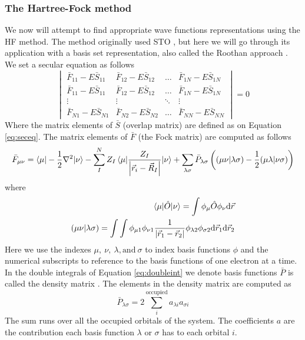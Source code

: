 \documentclass[../master_thesis.tex]{subfiles}
\begin{document}
\subsubsection{The Hartree-Fock method}
We now will attempt to find appropriate wave functions representations using the \ac{HF} method.
The method originally used \ac{STO} \cite{Cramer:2004}, but here we will
go through its application with a basis set representation, also called the Roothan approach
\cite{Cramer:2004, Helgaker:2012}.
We set a secular equation as follows
\begin{equation}\label{eq:fockseceq}
  \begin{vmatrix}
    \bar{F}_{11} - E\bar{S}_{11} & \bar{F}_{12} - E\bar{S}_{12} & \ldots & \bar{F}_{1N} - E\bar{S}_{1N} \\
    \bar{F}_{11} - E\bar{S}_{11} & \bar{F}_{12} - E\bar{S}_{12} & \ldots & \bar{F}_{1N} - E\bar{S}_{1N} \\
    \vdots & \vdots & \ddots & \vdots\\
    \bar{F}_{N1} - E\bar{S}_{N1} & \bar{F}_{N2} - E\bar{S}_{N2} & \ldots & \bar{F}_{NN} - E\bar{S}_{NN}
  \end{vmatrix} = 0
\end{equation}
Where the matrix elements of $\bar{S}$ (overlap matrix) are defined as on Equation
\ref{eq:seceq}. The matrix elements of $\bar{F}$ (the Fock matrix) are computed
as follows \cite{Cramer:2004}
\begin{equation}\label{eq:Fockmatrix}
  \bar{F}_{\mu\nu} = \braket{\mu|-\frac{1}{2}\nabla^2|\nu}
  - \sum^N_IZ_I\braket{\mu|\frac{Z_I}{\abs{\vec{r}_i
  - \vec{R}_I}}|\nu} + \sum_{\lambda\sigma} \bar{P}_{\lambda \sigma}\left( (\mu\nu|\lambda\sigma) - \frac{1}{2}(\mu\lambda|\nu\sigma) \right)
\end{equation}
where
\begin{align}\label{eq:doubleint}
  \braket{\mu|\hat{O}| \nu} = \int\phi_{\mu}\hat{O}\phi_{\nu}\text{d}\vec{r}\\
  (\mu\nu|\lambda\sigma) = \int\int\phi_{\mu1}\phi_{\nu1}\frac{1}{\abs{\vec{r}_1 - \vec{r}_2}}\phi_{\lambda2}\phi_{\sigma2} \text{d}\vec{r}_1\text{d}\vec{r}_2
\end{align}
Here we use the indexes $\mu,\ \nu,\ \lambda, \text{and}\ \sigma$ to index basis
functions $\phi$ and the numerical subscripts to reference to the basis functions
of one electron at a time.
In the double integrals of Equation \ref{eq:doubleint} we denote basis functions
$\bar{P}$ is called the density matrix \cite{Cramer:2004}. The elements in the
density matrix are computed as \cite{Cramer:2004}
\begin{equation}
  \bar{P}_{\lambda\sigma} = 2 \sum_i^{\text{occupied}}a_{\lambda i}a_{\sigma i}
\end{equation}
The sum runs over all the occupied orbitals of the system. The coefficients $a$
are the contribution each basis function $\lambda$ or $\sigma$ has to each orbital $i$.
\end{document}
